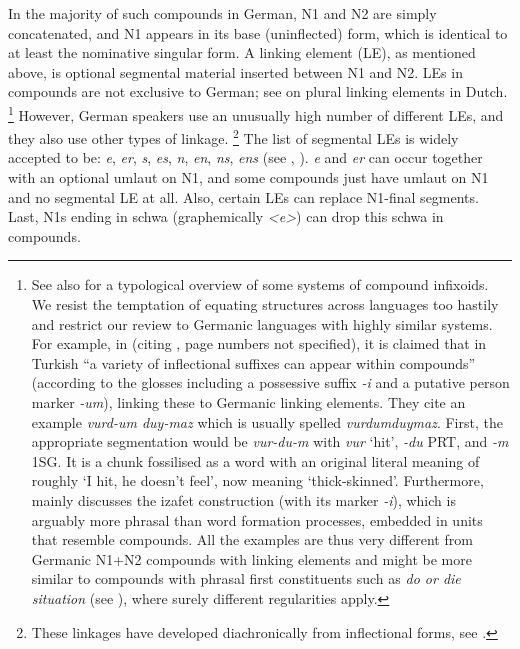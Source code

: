In the majority of such compounds in German, N1 and N2 are simply concatenated, and N1 appears in its base (uninflected) form, which is identical to at least the nominative singular form.
A linking element (LE), as mentioned above, is optional segmental material inserted between N1 and N2.
LEs in compounds are not exclusive to German; see \textcite{SchreuderEa1998,BangaEa2013a,BangaEa2013b} on plural linking elements in Dutch.%
\footnote{See also \textcite[27]{KrottEa2007} for a typological overview of some systems of compound infixoids.
We resist the temptation of equating structures across languages too hastily and restrict our review to Germanic languages with highly similar systems.
For example, in \textcite[4]{KirchnerNicoladis2009} (citing \citealt{Spencer1991}, page numbers not specified), it is claimed that in Turkish ``a variety of inflectional suffixes can appear within compounds'' (according to the glosses including a possessive suffix \textit{-i} and a putative person marker \mbox{\textit{-um}}), linking these to Germanic linking elements.
They cite an example \textit{vurd-um duy-maz} which is usually spelled \textit{vurdumduymaz}.
First, the appropriate segmentation would be \textit{vur-du-m} with \textit{vur} `hit', \textit{-du} PRT, and \textit{-m} \textsc{1SG}.
It is a chunk fossilised as a word with an original literal meaning of roughly `I hit, he doesn't feel', now meaning `thick-skinned'.
Furthermore, \textcite[313--319]{Spencer1991} mainly discusses the izafet construction (with its marker \textit{-i}), which is arguably more phrasal than word formation processes, embedded in units that resemble compounds.
All the examples are thus very different from Germanic N1+N2 compounds with linking elements and might be more similar to compounds with phrasal first constituents such as \textit{do or die situation} (see \citealt[366]{Olsen2015}), where surely different regularities apply.
}
However, German speakers use an unusually high number of different LEs, and they also use other types of linkage.%
\footnote{These linkages have developed diachronically from inflectional forms, see \textcite{NueblingSzczepaniak2013,Szczepaniak2016}.}
The list of segmental LEs is widely accepted to be: \textit{e}, \textit{er}, \textit{s}, \textit{es}, \textit{n}, \textit{en}, \textit{ns}, \textit{ens} (see \citealt[31]{Neef2015}, \citealt{KrottEa2007}).
\textit{e} and \textit{er} can occur together with an optional umlaut on N1, and some compounds just have umlaut on N1 and no segmental LE at all.
Also, certain LEs can replace N1-final segments.
Last, N1s ending in schwa (graphemically \textit{<e>}) can drop this schwa in compounds.

